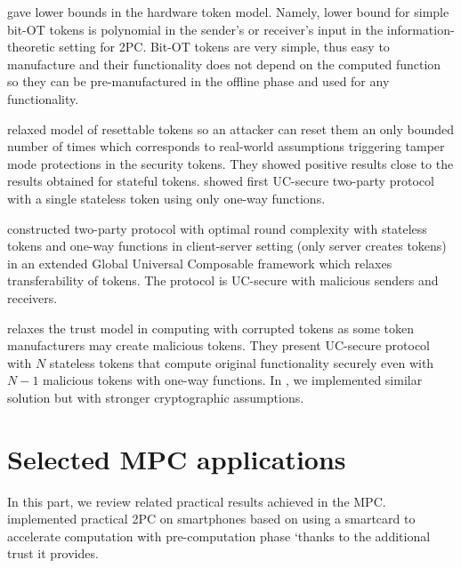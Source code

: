\documentclass[
  digital, %
  twoside, %
  table,   %
  lof,     %
  lot,     %
]{fithesis3}
\theoremstyle{definition}
\theoremstyle{remark}
\begin{document}
\cite{AAGPR13} gave lower bounds in the hardware token model. Namely, lower bound for simple bit-OT tokens is polynomial in the sender's or receiver's input in the information-theoretic setting for 2PC. Bit-OT tokens are very simple, thus easy to manufacture and their functionality does not depend on the computed function so they can be pre-manufactured in the offline phase and used for any functionality.

\cite{DKMN15} relaxed model of resettable tokens so an attacker can reset them an only bounded number of times which corresponds to real-world assumptions triggering tamper mode protections in the security tokens. They showed positive results close to the results obtained for stateful tokens. \cite{DKMN15b} showed first UC-secure two-party protocol with a single stateless token using only one-way functions.

\cite{HPV16} constructed two-party protocol with optimal round complexity with stateless tokens and one-way functions in client-server setting (only server creates tokens) in an extended Global Universal Composable framework which relaxes transferability of tokens. The protocol is UC-secure with malicious senders and receivers.

\cite{CCOV17} relaxes the trust model in computing with corrupted tokens as some token manufacturers may create malicious tokens. They present UC-secure protocol with $N$ stateless tokens that compute original functionality securely even with $N-1$ malicious tokens with one-way functions. In \cite{2017-ccs-mavroudis}, we implemented similar solution but with stronger cryptographic assumptions.


\section{Selected MPC applications}\label{sec:soa:applications}
%
In this part, we review related practical results achieved in the MPC.
\cite{DSZ14} implemented practical 2PC on smartphones based on \cite{GMW87} using a smartcard to accelerate computation with pre-computation phase `thanks to the additional trust it provides.
\end{document}
